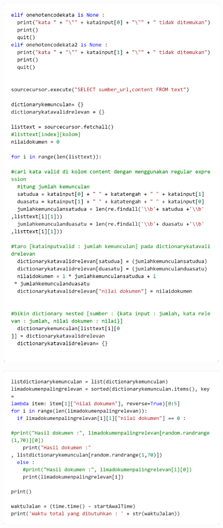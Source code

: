 \documentclass[12pt]{report}
\begin{document}
\begin{figure}[H]
\centering
\includegraphics[scale=0.3]{search2cbow3}
\end{figure}
\begin{figure}[H]
\centering
\includegraphics[scale=0.3]{search2cbow4}
\end{figure}
\end{document}
